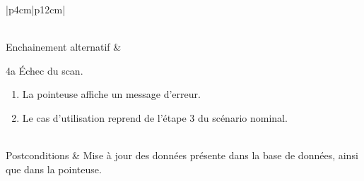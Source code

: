 \begin{longtable}{|p{4cm}|p{12cm}|}
\begin{minipage}[t]{\linewidth}
\begin{enumerate}[itemindent=0pt, leftmargin=*, nosep,before=\vspace{-0.5\baselineskip},after=\vspace{0.2\baselineskip}]
                            \end{enumerate}
                    \end{minipage}
                    \\
                    \hline
                    Enchainement alternatif & 
                    \begin{minipage}[t]{\linewidth}
                            4a Échec du scan.
                            \begin{enumerate}[nosep,after=\strut, leftmargin=*]
                                \item La pointeuse affiche un message d’erreur.
                                \item Le cas d’utilisation reprend de l’étape 3 du scénario nominal.
                            \end{enumerate}
                    \end{minipage}
                    \\
                    
                    \hline
                    Postconditions & Mise à jour des données présente dans la base de données, ainsi que dans la pointeuse.
                    \\
                    \hline
                    \caption{Description du cas d'utilisation « Ajouter une empreinte »}\\
            \end{longtable}
            
